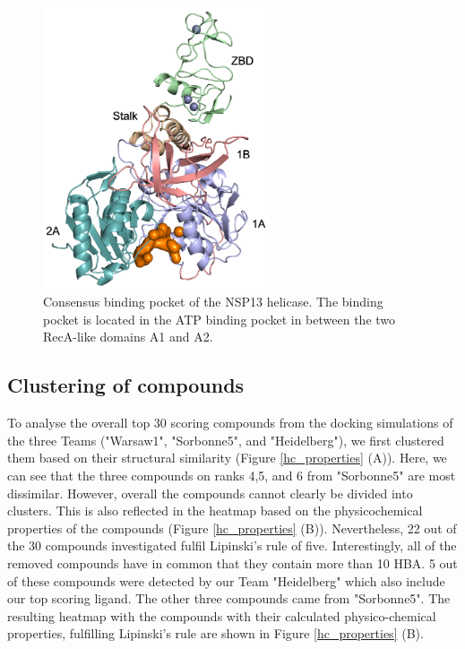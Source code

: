 \documentclass[11pt, letterpaper, titlepage]{article}
\begin{document}
\begin{figure}
    \centering
    \includegraphics[width=0.6\textwidth]{consens_domain_big.pdf}
    \caption{Consensus binding pocket of the NSP13 helicase. The binding pocket is located in the ATP binding pocket in between the two RecA-like domains A1 and A2.}
    \label{consensus_binding_pocket}
\end{figure}
\FloatBarrier

\subsection{Clustering of compounds}
To analyse the overall top 30 scoring compounds from the docking simulations of the three Teams ("Warsaw1", "Sorbonne5", and "Heidelberg"), we first clustered them based on their structural similarity (Figure \ref{hc_properties} (A)). Here, we can see that the three compounds on ranks 4,5, and 6 from "Sorbonne5" are most dissimilar. However, overall the compounds cannot clearly be divided into clusters. This is also reflected in the heatmap based on the physicochemical properties of the compounds (Figure \ref{hc_properties} (B)). Nevertheless, 22 out of the 30 compounds investigated fulfil Lipinski's rule of five. Interestingly, all of the removed compounds have in common that they contain more than 10 \ac{HBA}. 5 out of these compounds were detected by our Team "Heidelberg" which also include our top scoring ligand. The other three compounds came from "Sorbonne5". 
The resulting heatmap with the compounds with their calculated physico-chemical properties, fulfilling Lipinski's rule are shown in Figure \ref{hc_properties} (B).  
\end{document}
